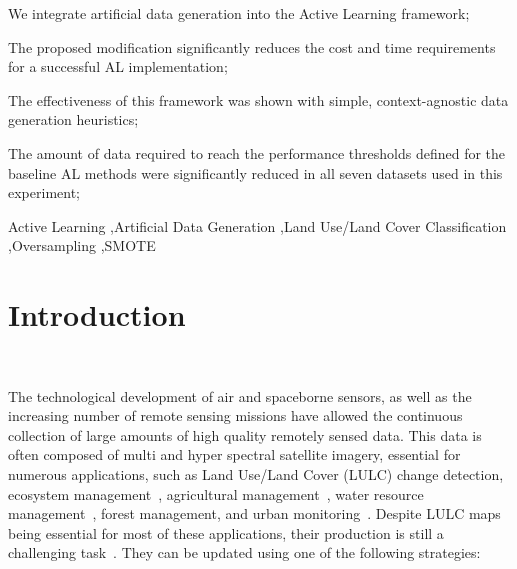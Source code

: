 \documentclass[preprint,12pt]{elsarticle}
\begin{document}
\begin{frontmatter}
\begin{highlights}
\item We integrate artificial data generation into the Active Learning
    framework;
\item The proposed modification significantly reduces the cost and time
    requirements for a successful AL implementation;
\item The effectiveness of this framework was shown with simple,
    context-agnostic data generation heuristics;
\item The amount of data required to reach the performance thresholds defined
    for the baseline AL methods were significantly reduced in all seven
    datasets used in this experiment;
\end{highlights}

\begin{keyword}
Active Learning \sep Artificial Data Generation \sep Land Use/Land Cover
Classification \sep Oversampling \sep SMOTE
\end{keyword}

\end{frontmatter}


\section{Introduction}~\label{sec:introduction}

The technological development of air and spaceborne sensors, as well as the
increasing number of remote sensing missions have allowed the continuous
collection of large amounts of high quality remotely sensed data. This data is
often composed of multi and hyper spectral satellite imagery, essential for
numerous applications, such as Land Use/Land Cover (LULC) change detection,
ecosystem management~\cite{Nagai2020}, agricultural
management~\cite{Huang2018}, water resource management~\cite{Wang2018}, forest
management, and urban monitoring~\cite{Khatami2016}. Despite LULC maps being
essential for most of these applications, their production is still a
challenging task~\cite{Gavade2019, Wulder2018}. They can be updated using
one of the following strategies:
\end{document}
